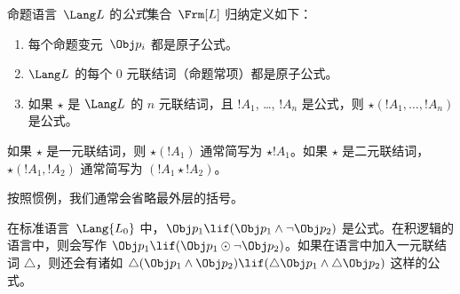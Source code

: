 \documentclass[../../../include/open-logic-section]{subfiles}
\begin{document}


\begin{defn}[公式]
命题语言~$\Lang L$ 的\emph{公式}集合~$\Frm[L]$ 归纳定义如下：
\begin{enumerate}
\item 每个命题变元~$\Obj p_i$ 都是原子公式。
\item $\Lang L$ 的每个 $0$ 元联结词（命题常项）都是原子公式。
\item 如果 $\star$ 是 $\Lang L$ 的 $n$ 元联结词，且 $!A_1$,
\dots, $!A_n$ 是公式，则 $\star(!A_1, \dots, !A_n)$ 是公式。
\end{enumerate}
如果 $\star$ 是一元联结词，则 $\star(!A_1)$ 通常简写为 $\star !A_1$。如果 $\star$ 是二元联结词，$\star(!A_1,!A_2)$
通常简写为 $(!A_1 \star !A_2)$。
\end{defn}

按照惯例，我们通常会省略最外层的括号。

\begin{ex}
  在标准语言~$\Lang{L_0}$ 中，$\Obj p_1 \lif (\Obj p_1
  \land \lnot \Obj p_2)$ 是公式。在积逻辑的语言中，则会写作 $\Obj p_1 \lif (\Obj p_1 \odot
  \lnot \Obj p_2)$。如果在语言中加入一元联结词 $\triangle$，则还会有诸如 $\triangle (\Obj p_1
  \land \Obj p_2) \lif (\triangle \Obj p_1 \land \triangle \Obj p_2)$ 这样的公式。
\end{ex}
\end{document}
